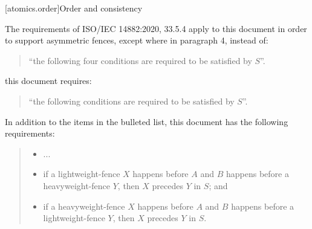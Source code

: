 

[atomics.order]{Order and consistency}

The requirements of ISO/IEC 14882:2020, 33.5.4 apply to this document in order to support asymmetric fences, except where in  paragraph 4, instead of:

\begin{quote}
``the following four conditions are required to be satisfied by $S$''.
\end{quote}

this document requires:

\begin{quote}
``the following conditions are required to be satisfied by $S$''.
\end{quote}

In addition to the items in the bulleted list, this document has the following requirements:
\begin{quote}
\begin{itemize}
\item
  ...
\item
if a  lightweight-fence $X$ happens before $A$ and $B$ happens
before a  heavyweight-fence $Y$, then $X$ precedes $Y$ in $S$; and
\item  if a  heavyweight-fence $X$ happens before $A$ and $B$ happens
before a  lightweight-fence $Y$, then $X$ precedes $Y$ in $S$.
\end{itemize}
\end{quote}
